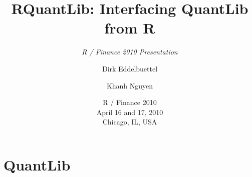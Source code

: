 \documentclass[compress]{beamer}
\title[RQuantLib]{RQuantLib: Interfacing QuantLib from R}  %
\subtitle{\textsl{R / Finance 2010 Presentation}}
\author[Eddelbuettel \and Nguyen]{Dirk Eddelbuettel\inst{1} \and Khanh Nguyen\inst{2}}
\institute[Debian and UMASS]{
  \inst{1}%
  Debian Project
  \and 
  \inst{2}
  UMASS at Boston
}
\date[R / Finance 2010]{R / Finance 2010 \\ April 16 and 17, 2010 \\ Chicago, IL, USA}
\begin{document}
\begin{frame}
  \titlepage
\end{frame}


\section{QuantLib}
\end{document}
